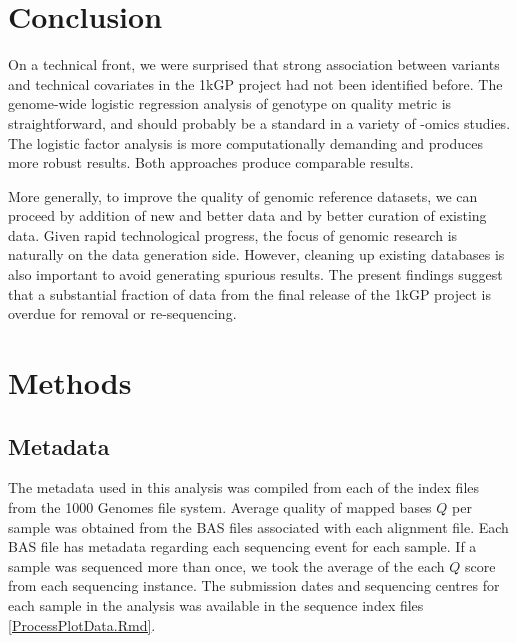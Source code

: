 \documentclass[9pt,lineno]{elife}
\begin{document}
\section{Conclusion}

On a technical front, we were surprised that strong association between variants and technical covariates in the 1kGP project had not been identified before. 
The genome-wide logistic regression analysis of genotype on quality metric is straightforward, and should probably be a standard in a variety of -omics studies. The logistic factor analysis is more computationally demanding and produces more robust results. Both approaches produce comparable results.  

More generally, to improve the quality of genomic reference datasets, we can proceed by addition of new and better data and by better curation of existing data.
Given rapid technological progress, the focus of genomic research is naturally on the data generation side. 
However, cleaning up existing databases is also important to avoid generating spurious results. 
The present findings suggest that a substantial fraction of data from the final release of the 1kGP project is overdue for removal or re-sequencing.



\section{Methods}
\subsection{Metadata}
The metadata used in this analysis was compiled from each of the index files from the 1000 Genomes file system. 
Average quality of mapped bases $Q$ per sample was obtained from the BAS files associated with each alignment file. 
Each BAS file has metadata regarding each sequencing event for each sample. 
If a sample was sequenced more than once, we took the average of the each $Q$ score from each sequencing instance. 
The submission dates and sequencing centres for each sample in the analysis was available in the sequence index files \ref{ProcessPlotData.Rmd}.
\end{document}
